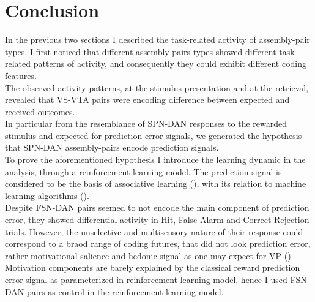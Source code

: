 \section{Conclusion}
In the previous two sections I described the task-related activity of assembly-pair types. I first noticed that different assembly-pairs types showed different task-related patterns of activity, and consequently they could exhibit different coding features.\\The observed activity patterns, at the stimulus presentation and at the retrieval, revealed that VS-VTA pairs were encoding difference between expected and received outcomes.\\In particular from the resemblance of SPN-DAN responses to the rewarded stimulus and expected for prediction error signals, we generated the hypothesis that SPN-DAN assembly-pairs encode prediction signals.\\To prove the aforementioned hypothesis I introduce the learning dynamic in the analysis, through a reinforcement learning model. The prediction signal is considered to be the basis of associative learning (\cite{RescorlaWagner}), with its relation to machine learning algorithms (\cite{SuttonBarto}).\\Despite FSN-DAN pairs seemed to not encode the main component of prediction error, they showed differential activity in Hit, False Alarm and Correct Rejection trials. However, the unselective and multisensory nature of their response could correspond to a braod range of coding futures, that did not look prediction error, rather motivational salience and hedonic signal as one may expect for VP (\cite{Root}).\\ Motivation components are barely explained by the classical reward prediction error signal as parameterized in reinforcement learning model, hence I used FSN-DAN pairs as control in the reinforcement learning model.